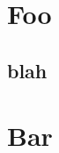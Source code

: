 \documentclass{article}
\begin{document}
\tableofcontents
\section{Foo}
\subsection{blah}
\section{Bar}
\end{document}
